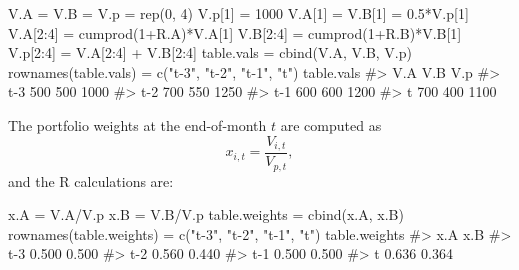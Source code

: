 \documentclass[
  letterpaper,
  DIV=11,
  numbers=noendperiod]{scrreprt}
\newenvironment{Shaded}{\begin{snugshade}}{\end{snugshade}}
\newcommand{\CommentTok}[1]{\textcolor[rgb]{0.37,0.37,0.37}{#1}}
\newcommand{\DecValTok}[1]{\textcolor[rgb]{0.68,0.00,0.00}{#1}}
\newcommand{\FloatTok}[1]{\textcolor[rgb]{0.68,0.00,0.00}{#1}}
\newcommand{\FunctionTok}[1]{\textcolor[rgb]{0.28,0.35,0.67}{#1}}
\newcommand{\NormalTok}[1]{\textcolor[rgb]{0.00,0.23,0.31}{#1}}
\newcommand{\OtherTok}[1]{\textcolor[rgb]{0.00,0.23,0.31}{#1}}
\newcommand{\SpecialCharTok}[1]{\textcolor[rgb]{0.37,0.37,0.37}{#1}}
\newcommand{\StringTok}[1]{\textcolor[rgb]{0.13,0.47,0.30}{#1}}
\theoremstyle{definition}
\theoremstyle{definition}
\theoremstyle{remark}
\begin{document}
\begin{Shaded}
\begin{Highlighting}[]
\NormalTok{V.A }\OtherTok{=}\NormalTok{ V.B }\OtherTok{=}\NormalTok{ V.p }\OtherTok{=} \FunctionTok{rep}\NormalTok{(}\DecValTok{0}\NormalTok{, }\DecValTok{4}\NormalTok{)}
\NormalTok{V.p[}\DecValTok{1}\NormalTok{] }\OtherTok{=} \DecValTok{1000}
\NormalTok{V.A[}\DecValTok{1}\NormalTok{] }\OtherTok{=}\NormalTok{ V.B[}\DecValTok{1}\NormalTok{] }\OtherTok{=} \FloatTok{0.5}\SpecialCharTok{*}\NormalTok{V.p[}\DecValTok{1}\NormalTok{]}
\NormalTok{V.A[}\DecValTok{2}\SpecialCharTok{:}\DecValTok{4}\NormalTok{] }\OtherTok{=} \FunctionTok{cumprod}\NormalTok{(}\DecValTok{1}\SpecialCharTok{+}\NormalTok{R.A)}\SpecialCharTok{*}\NormalTok{V.A[}\DecValTok{1}\NormalTok{]}
\NormalTok{V.B[}\DecValTok{2}\SpecialCharTok{:}\DecValTok{4}\NormalTok{] }\OtherTok{=} \FunctionTok{cumprod}\NormalTok{(}\DecValTok{1}\SpecialCharTok{+}\NormalTok{R.B)}\SpecialCharTok{*}\NormalTok{V.B[}\DecValTok{1}\NormalTok{]}
\NormalTok{V.p[}\DecValTok{2}\SpecialCharTok{:}\DecValTok{4}\NormalTok{] }\OtherTok{=}\NormalTok{ V.A[}\DecValTok{2}\SpecialCharTok{:}\DecValTok{4}\NormalTok{] }\SpecialCharTok{+}\NormalTok{ V.B[}\DecValTok{2}\SpecialCharTok{:}\DecValTok{4}\NormalTok{]}
\NormalTok{table.vals }\OtherTok{=} \FunctionTok{cbind}\NormalTok{(V.A, V.B, V.p)}
\FunctionTok{rownames}\NormalTok{(table.vals) }\OtherTok{=} \FunctionTok{c}\NormalTok{(}\StringTok{"t{-}3"}\NormalTok{, }\StringTok{"t{-}2"}\NormalTok{, }\StringTok{"t{-}1"}\NormalTok{, }\StringTok{"t"}\NormalTok{)}
\NormalTok{table.vals}
\CommentTok{\#\textgreater{}     V.A V.B  V.p}
\CommentTok{\#\textgreater{} t{-}3 500 500 1000}
\CommentTok{\#\textgreater{} t{-}2 700 550 1250}
\CommentTok{\#\textgreater{} t{-}1 600 600 1200}
\CommentTok{\#\textgreater{} t   700 400 1100}
\end{Highlighting}
\end{Shaded}

The portfolio weights at the end-of-month \(t\) are computed as
\[x_{i,t} = \frac{V_{i,t}}{V_{p,t}},\] and the R calculations are:

\begin{Shaded}
\begin{Highlighting}[]
\NormalTok{x.A }\OtherTok{=}\NormalTok{ V.A}\SpecialCharTok{/}\NormalTok{V.p}
\NormalTok{x.B }\OtherTok{=}\NormalTok{ V.B}\SpecialCharTok{/}\NormalTok{V.p}
\NormalTok{table.weights }\OtherTok{=} \FunctionTok{cbind}\NormalTok{(x.A, x.B)}
\FunctionTok{rownames}\NormalTok{(table.weights) }\OtherTok{=} \FunctionTok{c}\NormalTok{(}\StringTok{"t{-}3"}\NormalTok{, }\StringTok{"t{-}2"}\NormalTok{, }\StringTok{"t{-}1"}\NormalTok{, }\StringTok{"t"}\NormalTok{)}
\NormalTok{table.weights}
\CommentTok{\#\textgreater{}       x.A   x.B}
\CommentTok{\#\textgreater{} t{-}3 0.500 0.500}
\CommentTok{\#\textgreater{} t{-}2 0.560 0.440}
\CommentTok{\#\textgreater{} t{-}1 0.500 0.500}
\CommentTok{\#\textgreater{} t   0.636 0.364}
\end{Highlighting}
\end{Shaded}
\end{document}
